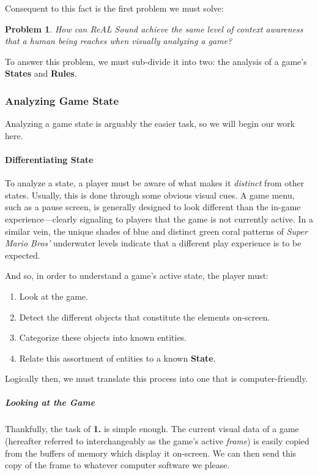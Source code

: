 \documentclass{report}
\newcommand{\rs}{ReAL Sound\xspace}
\newcommand{\state}[1]{\textbf{#1}}
\begin{document}
Consequent to this fact is the first problem we must solve: 

\newtheorem{q1}{Problem}
\begin{q1}
    How can \rs achieve the same level of context awareness that a human being reaches when visually analyzing a game? 
\end{q1}

To answer this problem, we must sub-divide it into two: the analysis of a game's \state{States} and \state{Rules}.

\subsubsection{Analyzing Game State}

Analyzing a game state is arguably the easier task, so we will begin our work here. 

\paragraph{Differentiating State}

To analyze a state, a player must be aware of what makes it \emph{distinct} from other states. Usually, this is done through some obvious visual cues. A game menu, such as a pause screen, is generally designed to look different than the in-game experience---clearly signaling to players that the game is not currently active. In a similar vein, the unique shades of blue and distinct green coral patterns of \emph{Super Mario Bros'} underwater levels indicate that a different play experience is to be expected. 

And so, in order to understand a game's active state, the player must:

\begin{enumerate}
    \item Look at the game.
    \item Detect the different objects that constitute the elements on-screen. 
    \item Categorize these objects into known entities.
    \item Relate this assortment of entities to a known \state{State}. 
\end{enumerate}

Logically then, we must translate this process into one that is computer-friendly.

\subparagraph{Looking at the Game}
Thankfully, the task of \textbf{1.} is simple enough. The current visual data of a game (hereafter referred to interchangeably as the game's active \emph{frame}) is easily copied from the buffers of memory which display it on-screen. We can then send this copy of the frame to whatever computer software we please.
\end{document}
